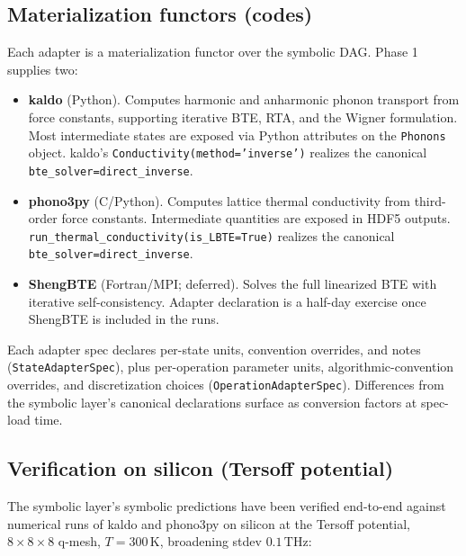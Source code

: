 \documentclass[11pt,a4paper]{article}
\begin{document}
\subsection{Materialization functors (codes)}

Each adapter is a materialization functor over the symbolic DAG. Phase 1 supplies two:

\begin{itemize}[leftmargin=2em]
  \item \textbf{kaldo} (Python). Computes harmonic and anharmonic phonon transport from
        force constants, supporting iterative BTE, RTA, and the Wigner formulation.
        Most intermediate states are exposed via Python attributes on the
        \texttt{Phonons} object. kaldo's \texttt{Conductivity(method='inverse')}
        realizes the canonical \texttt{bte\_solver=direct\_inverse}.
  \item \textbf{phono3py} (C/Python). Computes lattice thermal conductivity from
        third-order force constants. Intermediate quantities are exposed in HDF5
        outputs. \texttt{run\_thermal\_conductivity(is\_LBTE=True)} realizes the
        canonical \texttt{bte\_solver=direct\_inverse}.
  \item \textbf{ShengBTE} (Fortran/MPI; deferred). Solves the full linearized BTE with
        iterative self-consistency. Adapter declaration is a half-day exercise once
        ShengBTE is included in the runs.
\end{itemize}

Each adapter spec declares per-state units, convention overrides, and notes
(\texttt{StateAdapterSpec}), plus per-operation parameter units, algorithmic-convention
overrides, and discretization choices (\texttt{OperationAdapterSpec}). Differences
from the symbolic layer's canonical declarations surface as conversion factors at
spec-load time.

\subsection{Verification on silicon (Tersoff potential)}
\label{ssec:silicon-verification}

The symbolic layer's symbolic predictions have been verified end-to-end against numerical
runs of kaldo and phono3py on silicon at the Tersoff potential, $8\times 8\times 8$
q-mesh, $T = 300\,\text{K}$, broadening stdev $0.1\,\text{THz}$:
\end{document}
